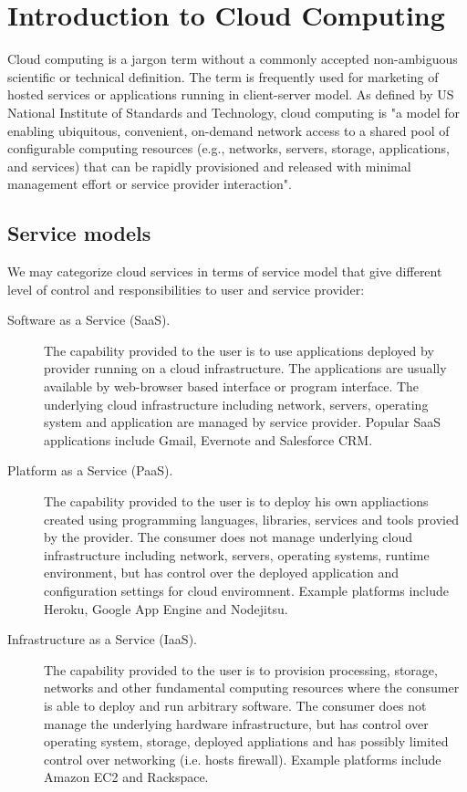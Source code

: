 \section{Introduction to Cloud Computing}
\label{intro:cloud}

Cloud computing is a jargon term without a commonly accepted non-ambiguous scientific or technical definition. The term is frequently used for marketing of hosted services or applications running in client-server model. As defined by US National Institute of Standards and Technology\cite{NISTCloudDef}, cloud computing is "a model for enabling ubiquitous, convenient, on-demand network access to a shared pool of configurable computing resources (e.g., networks, servers, storage, applications, and services) that can be rapidly provisioned and released with minimal management effort or service provider interaction".

\subsection{Service models}

We may categorize cloud services in terms of service model that give different level of control and responsibilities to user and service provider:

\begin{description}
  \item[Software as a Service (SaaS).] The capability provided to the user is to use applications deployed by provider running on a cloud infrastructure. The applications are usually available by web-browser based interface or program interface. The underlying cloud infrastructure including network, servers, operating system and application are managed by service provider. Popular SaaS applications include Gmail, Evernote and Salesforce CRM.
  \item[Platform as a Service (PaaS).] The capability provided to the user is to deploy his own appliactions created using programming languages, libraries, services and tools provied by the provider. The consumer does not manage underlying cloud infrastructure including network, servers, operating systems, runtime environment, but has control over the deployed application and configuration settings for cloud enviromnent. Example platforms include Heroku, Google App Engine and Nodejitsu.
  \item[Infrastructure as a Service (IaaS).] The capability provided to the user is to provision processing, storage, networks and other fundamental computing resources where the consumer is able to deploy and run arbitrary software. The consumer does not manage the underlying hardware infrastructure, but has control over operating system, storage, deployed appliations and has possibly limited control over networking (i.e. hosts firewall). Example platforms include Amazon EC2 and Rackspace.
\end{description}

